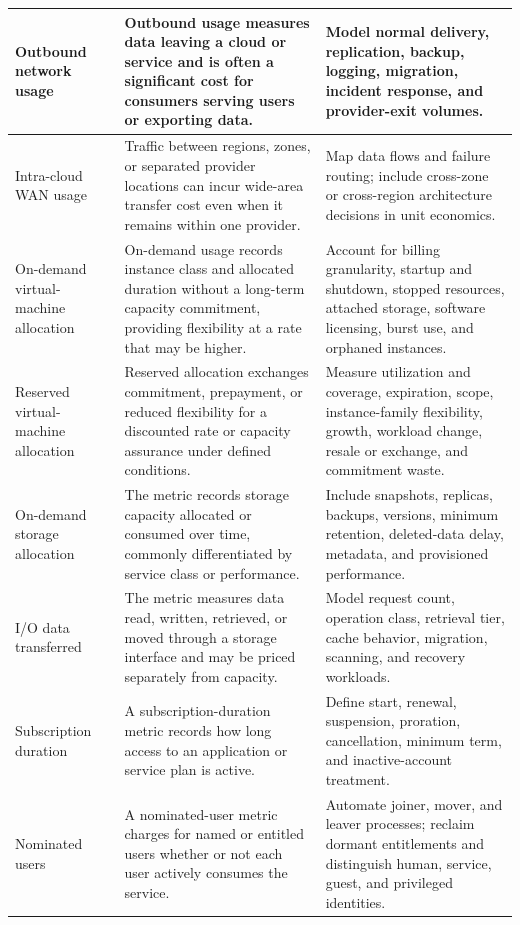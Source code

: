\documentclass[11pt]{article}
\begin{document}
\begin{longtable}{@{}>{\RaggedRight\arraybackslash}p{}>{\RaggedRight\arraybackslash}p{}>{\RaggedRight\arraybackslash}p{}@{}}
Outbound network usage & Outbound usage measures data leaving a cloud or service and is often a significant cost for consumers serving users or exporting data. & Model normal delivery, replication, backup, logging, migration, incident response, and provider-exit volumes. \\\midrule
Intra-cloud WAN usage & Traffic between regions, zones, or separated provider locations can incur wide-area transfer cost even when it remains within one provider. & Map data flows and failure routing; include cross-zone or cross-region architecture decisions in unit economics. \\\midrule
On-demand virtual-machine allocation & On-demand usage records instance class and allocated duration without a long-term capacity commitment, providing flexibility at a rate that may be higher. & Account for billing granularity, startup and shutdown, stopped resources, attached storage, software licensing, burst use, and orphaned instances. \\\midrule
Reserved virtual-machine allocation & Reserved allocation exchanges commitment, prepayment, or reduced flexibility for a discounted rate or capacity assurance under defined conditions. & Measure utilization and coverage, expiration, scope, instance-family flexibility, growth, workload change, resale or exchange, and commitment waste. \\\midrule
On-demand storage allocation & The metric records storage capacity allocated or consumed over time, commonly differentiated by service class or performance. & Include snapshots, replicas, backups, versions, minimum retention, deleted-data delay, metadata, and provisioned performance. \\\midrule
I/O data transferred & The metric measures data read, written, retrieved, or moved through a storage interface and may be priced separately from capacity. & Model request count, operation class, retrieval tier, cache behavior, migration, scanning, and recovery workloads. \\\midrule
Subscription duration & A subscription-duration metric records how long access to an application or service plan is active. & Define start, renewal, suspension, proration, cancellation, minimum term, and inactive-account treatment. \\\midrule
Nominated users & A nominated-user metric charges for named or entitled users whether or not each user actively consumes the service. & Automate joiner, mover, and leaver processes; reclaim dormant entitlements and distinguish human, service, guest, and privileged identities. \\\midrule

\end{longtable}
\end{document}
